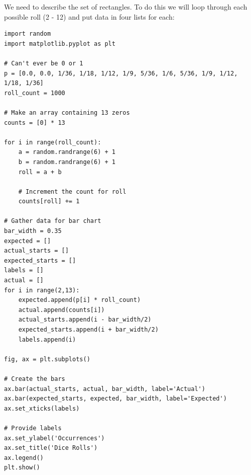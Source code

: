 We need to describe the set of rectangles. To do this we will loop through each possible roll (2 - 12) and put data in four lists for each:
\begin{verbatim}
import random
import matplotlib.pyplot as plt

# Can't ever be 0 or 1
p = [0.0, 0.0, 1/36, 1/18, 1/12, 1/9, 5/36, 1/6, 5/36, 1/9, 1/12, 1/18, 1/36]
roll_count = 1000

# Make an array containing 13 zeros
counts = [0] * 13

for i in range(roll_count):
    a = random.randrange(6) + 1
    b = random.randrange(6) + 1
    roll = a + b

    # Increment the count for roll
    counts[roll] += 1

# Gather data for bar chart
bar_width = 0.35
expected = []
actual_starts = []
expected_starts = []
labels = []
actual = []
for i in range(2,13):
    expected.append(p[i] * roll_count)
    actual.append(counts[i])      
    actual_starts.append(i - bar_width/2)
    expected_starts.append(i + bar_width/2)
    labels.append(i)
    
fig, ax = plt.subplots()
    
# Create the bars
ax.bar(actual_starts, actual, bar_width, label='Actual')
ax.bar(expected_starts, expected, bar_width, label='Expected')
ax.set_xticks(labels)

# Provide labels
ax.set_ylabel('Occurrences')
ax.set_title('Dice Rolls')
ax.legend()
plt.show()
\end{verbatim}

